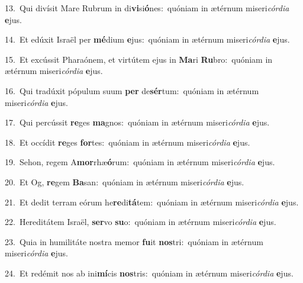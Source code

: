 {\numbfont\textcolor{\numbcolor}{13.}}~Qui divísit Mare Rubrum in di\-\textbf{vi}\-si\-\textbf{ó}\-nes:~\star quóniam in ætérnum miseri\-\textit{cór}\-\textit{di}\textit{a} \textbf{e}\-jus.\par
{\numbfont\textcolor{\numbcolor}{14.}}~Et edúxit Israël per \textbf{mé}\-dium \textbf{e}\-jus:~\star quóniam in ætérnum miseri\-\textit{cór}\-\textit{di}\textit{a} \textbf{e}\-jus.\par
{\numbfont\textcolor{\numbcolor}{15.}}~Et excússit Pharaónem, et virtútem ejus in \textbf{Ma}\-ri \textbf{Ru}\-bro:~\star quóniam in ætérnum miseri\-\textit{cór}\-\textit{di}\textit{a} \textbf{e}\-jus.\par
{\numbfont\textcolor{\numbcolor}{16.}}~Qui tradúxit pópulum suum \textbf{per} de\-\textbf{sér}\-tum:~\star quóniam in ætérnum miseri\-\textit{cór}\-\textit{di}\textit{a} \textbf{e}\-jus.\par
{\numbfont\textcolor{\numbcolor}{17.}}~Qui percússit \textbf{re}\-ges \textbf{ma}\-gnos:~\star quóniam in ætérnum miseri\-\textit{cór}\-\textit{di}\textit{a} \textbf{e}\-jus.\par
{\numbfont\textcolor{\numbcolor}{18.}}~Et occídit \textbf{re}\-ges \textbf{for}\-tes:~\star quóniam in ætérnum miseri\-\textit{cór}\-\textit{di}\textit{a} \textbf{e}\-jus.\par
{\numbfont\textcolor{\numbcolor}{19.}}~Sehon, regem A\-\textbf{mor}\-rhæ\-\textbf{ó}\-rum:~\star quóniam in ætérnum miseri\-\textit{cór}\-\textit{di}\textit{a} \textbf{e}\-jus.\par
{\numbfont\textcolor{\numbcolor}{20.}}~Et Og, \textbf{re}\-gem \textbf{Ba}\-san:~\star quóniam in ætérnum miseri\-\textit{cór}\-\textit{di}\textit{a} \textbf{e}\-jus.\par
{\numbfont\textcolor{\numbcolor}{21.}}~Et dedit terram eórum he\-\textbf{re}\-di\-\textbf{tá}\-tem:~\star quóniam in ætérnum miseri\-\textit{cór}\-\textit{di}\textit{a} \textbf{e}\-jus.\par
{\numbfont\textcolor{\numbcolor}{22.}}~Hereditátem Israël, \textbf{ser}\-vo \textbf{su}\-o:~\star quóniam in ætérnum miseri\-\textit{cór}\-\textit{di}\textit{a} \textbf{e}\-jus.\par
{\numbfont\textcolor{\numbcolor}{23.}}~Quia in humilitáte nostra memor \textbf{fu}\-it \textbf{nos}\-tri:~\star quóniam in ætérnum miseri\-\textit{cór}\-\textit{di}\textit{a} \textbf{e}\-jus.\par
{\numbfont\textcolor{\numbcolor}{24.}}~Et redémit nos ab ini\-\textbf{mí}\-cis \textbf{nos}\-tris:~\star quóniam in ætérnum miseri\-\textit{cór}\-\textit{di}\textit{a} \textbf{e}\-jus.\par
